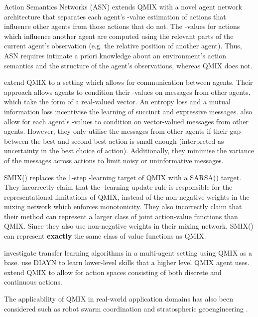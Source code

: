 \documentclass[twoside,11pt]{article}
\renewcommand{\cite}{\citep}
\begin{document}
Action Semantics Networks (ASN) \cite{wang_action_2019} extends QMIX with a novel agent network architecture that separates each agent's -value estimation of actions that influence other agents from those actions that do not.
The -values for actions which influence another agent are computed using the relevant parts of the current agent's observation (e.g. the relative position of another agent).
Thus, ASN requires 
intimate a priori knowledge about an environment's action semantics and the structure of the agent's observations, whereas QMIX does not.

\citet{wang_learning_2019} extend QMIX to a setting which allows for communication between agents.
Their approach allows agents to condition their -values on messages from other agents, which take the form of a real-valued vector. 
An entropy loss and a mutual information loss incentivise the learning of succinct and expressive messages.
\citet{zhang2019efficient} also allow for each agent's -values to condition on vector-valued messages from other agents. However, they only utilise the messages from other agents if their gap between the best and second-best action is small enough (interpreted as uncertainty in the best choice of action). Additionally, they minimise the variance of the messages across actions to limit noisy or uninformative messages.

SMIX() \cite{yao_smixlambda:_2019} replaces the 1-step -learning target of QMIX with a SARSA() target.
They incorrectly claim that the -learning update rule is responsible for the representational limitations of QMIX, instead of the non-negative weights in the mixing network which enforces monotonicity.
They also incorrectly claim that their method can represent a larger class of joint action-value functions than QMIX. 
Since they also use non-negative weights in their mixing network, SMIX() can represent \textbf{exactly} the same class of value functions as QMIX. 

\citet{liu2019value} investigate transfer learning algorithms in a multi-agent setting using QMIX as a base. \citet{yang2019hierarchical} use DIAYN \citep{eysenbach2018diversity} to learn lower-level skills that a higher level QMIX agent uses. \citet{fu2019deep} extend QMIX to allow for action spaces consisting of both discrete and continuous actions.

The applicability of QMIX in real-world application domains has also been considered such as robot swarm coordination \cite{huttenrauch_deep_2018} and stratospheric geoengineering \cite{de_witt_stratospheric_2019}. 
\end{document}
